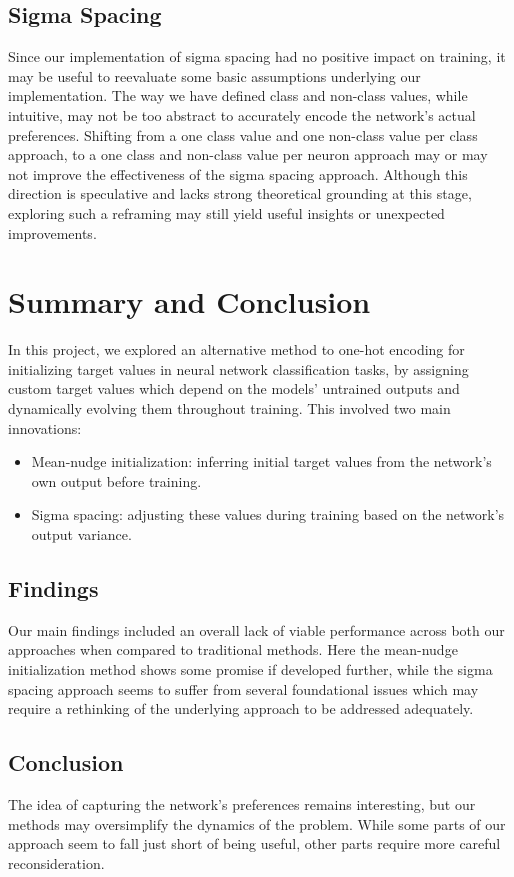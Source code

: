 \documentclass[12pt,fleqn,a4paper]{article}
\begin{document}
\subsection{Sigma Spacing}
Since our implementation of sigma spacing had no positive impact on training, it may be useful to reevaluate some basic assumptions underlying our implementation. The way we have defined class and non-class values, while intuitive, may not be too abstract to accurately encode the network's actual preferences. Shifting from a one class value and one non-class value per class approach, to a one class and non-class value per neuron approach may or may not improve the effectiveness of the sigma spacing approach. Although this direction is speculative and lacks strong theoretical grounding at this stage, exploring such a reframing may still yield useful insights or unexpected improvements.

\section{Summary and Conclusion}
In this project, we explored an alternative method to one-hot encoding for initializing target values in neural network classification tasks, by assigning custom target values which depend on the models' untrained outputs and dynamically evolving them throughout training. This involved two main innovations:
\begin{itemize}
    \item Mean-nudge initialization: inferring initial target values from the network's own output before training.
    \item Sigma spacing: adjusting these values during training based on the network's output variance. 
\end{itemize}

\subsection{Findings}
Our main findings included an overall lack of viable performance across both our approaches when compared to traditional methods. Here the mean-nudge initialization method shows some promise if developed further, while the sigma spacing approach seems to suffer from several foundational issues which may require a rethinking of the underlying approach to be addressed adequately.

\subsection{Conclusion}
The idea of capturing the network's preferences remains interesting, but our methods may oversimplify the dynamics of the problem. While some parts of our approach seem to fall just short of being useful, other parts require more careful reconsideration.
\end{document}
